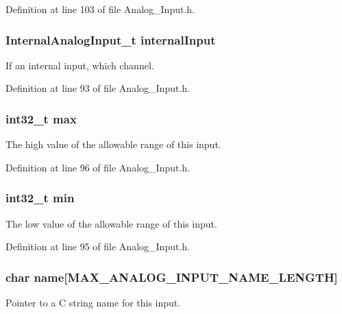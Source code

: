 Definition at line 103 of file Analog\-\_\-\-Input.\-h.

\hypertarget{struct_analog___input__t_a6a742e7de15fa168a904238051ba025e}{
\subsubsection[{internal\-Input}]{\setlength{\rightskip}{0pt plus 5cm}Internal\-Analog\-Input\-\_\-t internal\-Input}}\label{struct_analog___input__t_a6a742e7de15fa168a904238051ba025e}
If an internal input, which channel. 

Definition at line 93 of file Analog\-\_\-\-Input.\-h.

\hypertarget{struct_analog___input__t_accad1cdcd73e714badc388c3471bf33b}{
\subsubsection[{max}]{\setlength{\rightskip}{0pt plus 5cm}int32\-\_\-t max}}\label{struct_analog___input__t_accad1cdcd73e714badc388c3471bf33b}
The high value of the allowable range of this input. 

Definition at line 96 of file Analog\-\_\-\-Input.\-h.

\hypertarget{struct_analog___input__t_a0022b5ad7e496a802c64e3f6e0c2d8e1}{
\subsubsection[{min}]{\setlength{\rightskip}{0pt plus 5cm}int32\-\_\-t min}}\label{struct_analog___input__t_a0022b5ad7e496a802c64e3f6e0c2d8e1}
The low value of the allowable range of this input. 

Definition at line 95 of file Analog\-\_\-\-Input.\-h.

\hypertarget{struct_analog___input__t_a3a0b07d12d70fc1006109b23512b61fb}{
\subsubsection[{name}]{\setlength{\rightskip}{0pt plus 5cm}char name\mbox{[}{\bf M\-A\-X\-\_\-\-A\-N\-A\-L\-O\-G\-\_\-\-I\-N\-P\-U\-T\-\_\-\-N\-A\-M\-E\-\_\-\-L\-E\-N\-G\-T\-H}\mbox{]}}}\label{struct_analog___input__t_a3a0b07d12d70fc1006109b23512b61fb}
Pointer to a C string name for this input. 

